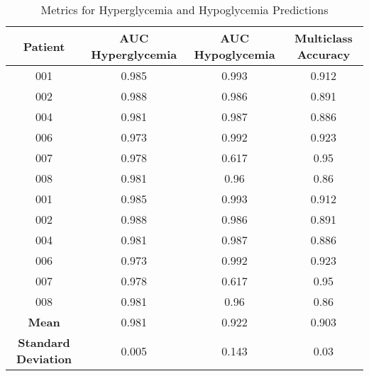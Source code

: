 \begin{table}[h!]
\centering
\caption{Metrics for Hyperglycemia and Hypoglycemia Predictions}
\label{tab:metrics}
\renewcommand{\arraystretch}{1.2}
\begin{tabular}{|c|c|c|c|}
\hline
\rowcolor{gray!20} \textbf{Patient} & \textbf{AUC Hyperglycemia} & \textbf{AUC Hypoglycemia} & \textbf{Multiclass Accuracy} \\
\hline
001 & 0.985 & 0.993 & 0.912 \\
\hline
002 & 0.988 & 0.986 & 0.891 \\
\hline
004 & 0.981 & 0.987 & 0.886 \\
\hline
006 & 0.973 & 0.992 & 0.923 \\
\hline
007 & 0.978 & 0.617 & 0.95 \\
\hline
008 & 0.981 & 0.96 & 0.86 \\
\hline
001 & 0.985 & 0.993 & 0.912 \\
\hline
002 & 0.988 & 0.986 & 0.891 \\
\hline
004 & 0.981 & 0.987 & 0.886 \\
\hline
006 & 0.973 & 0.992 & 0.923 \\
\hline
007 & 0.978 & 0.617 & 0.95 \\
\hline
008 & 0.981 & 0.96 & 0.86 \\
\hline
\rowcolor{gray!20}
\textbf{Mean} & 0.981 & 0.922 & 0.903 \\
\hline
\textbf{Standard Deviation} & 0.005 & 0.143 & 0.03 \\
\hline
\end{tabular}
\end{table}